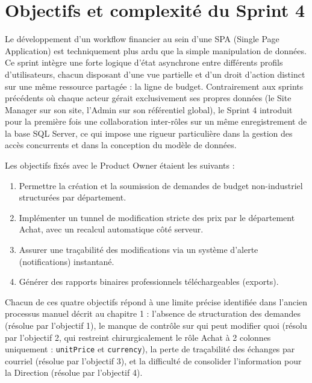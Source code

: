 \section{Objectifs et complexité du Sprint 4}
Le développement d'un workflow financier au sein d'une SPA (Single Page Application) est techniquement plus ardu que la simple manipulation de données. Ce sprint intègre une forte logique d'état asynchrone entre différents profils d'utilisateurs, chacun disposant d'une vue partielle et d'un droit d'action distinct sur une même ressource partagée : la ligne de budget. Contrairement aux sprints précédents où chaque acteur gérait exclusivement ses propres données (le Site Manager sur son site, l'Admin sur son référentiel global), le Sprint 4 introduit pour la première fois une collaboration inter-rôles sur un même enregistrement de la base SQL Server, ce qui impose une rigueur particulière dans la gestion des accès concurrents et dans la conception du modèle de données.

Les objectifs fixés avec le Product Owner étaient les suivants :
\begin{enumerate}
    \item Permettre la création et la soumission de demandes de budget non-industriel structurées par département.
    \item Implémenter un tunnel de modification stricte des prix par le département Achat, avec un recalcul automatique côté serveur.
    \item Assurer une traçabilité des modifications via un système d'alerte (notifications) instantané.
    \item Générer des rapports binaires professionnels téléchargeables (exports).
\end{enumerate}

Chacun de ces quatre objectifs répond à une limite précise identifiée dans l'ancien processus manuel décrit au chapitre 1 : l'absence de structuration des demandes (résolue par l'objectif 1), le manque de contrôle sur qui peut modifier quoi (résolu par l'objectif 2, qui restreint chirurgicalement le rôle Achat à 2 colonnes uniquement : \texttt{unitPrice} et \texttt{currency}), la perte de traçabilité des échanges par courriel (résolue par l'objectif 3), et la difficulté de consolider l'information pour la Direction (résolue par l'objectif 4).

